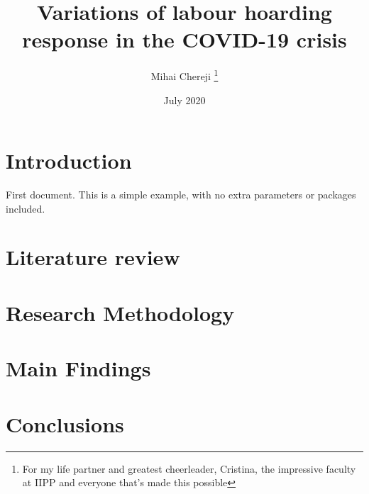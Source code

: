 \documentclass{article}
\title {Variations of labour hoarding response in the COVID-19 crisis}
\date {July 2020}
\author {Mihai Chereji
    \thanks{For my life partner and greatest cheerleader, Cristina, the impressive faculty at IIPP and everyone that's made this possible}
}
\begin{document}
\maketitle
\section{Introduction}
First document. This is a simple example, with no
extra parameters or packages included.
\section{Literature review}
\autocite{kruppe_labour_2014} \autocite{blanchard_hysteresis_1986}
\section{Research Methodology}
\section{Main Findings}
\section{Conclusions}
\begin{figure}
\end{figure}
\printbibliography{}
\end{document}
